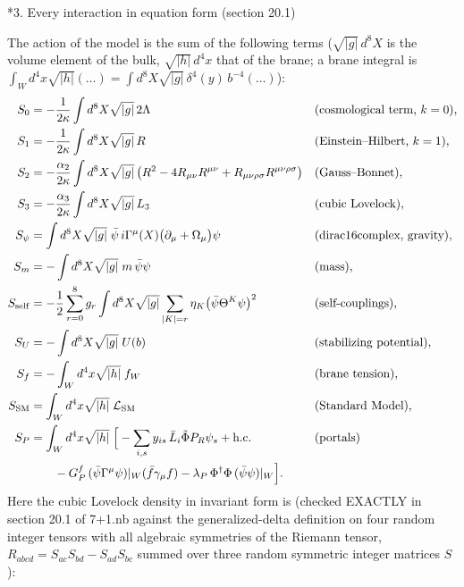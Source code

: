 \documentclass[10pt,a4paper]{article}
\makeatletter
\renewcommand\section{\@startsection{section}{1}{\z@}{-3.5ex \@plus -1ex \@minus -.2ex}{2.3ex \@plus.2ex}{\normalfont\Large\bfseries\raggedright}}
\makeatother
\begin{document}
\section*{3. Every interaction in equation form (section 20.1)}
The action of the model is the sum of the following terms ($\sqrt{|g|}\,d^8X$ is the volume element of the bulk, $\sqrt{|h|}\,d^4x$ that of the brane; a brane integral is $\int_Wd^4x\sqrt{|h|}(\dots)=\int d^8X\sqrt{|g|}\,\delta^4(y)\,b^{-4}(\dots)$):
\begin{align*}
S_0&=-\frac1{2\kappa}\int d^8X\sqrt{|g|}\,2\Lambda &&\text{(cosmological term, }k=0), \\
S_1&=-\frac1{2\kappa}\int d^8X\sqrt{|g|}\,R &&\text{(Einstein–Hilbert, }k=1), \\
S_2&=-\frac{\alpha_2}{2\kappa}\int d^8X\sqrt{|g|}\,\big(R^2-4R_{\mu\nu}R^{\mu\nu}+R_{\mu\nu\rho\sigma}R^{\mu\nu\rho\sigma}\big) &&\text{(Gauss–Bonnet)}, \\
S_3&=-\frac{\alpha_3}{2\kappa}\int d^8X\sqrt{|g|}\,L_3 &&\text{(cubic Lovelock)}, \\
S_\psi&=\int d^8X\sqrt{|g|}\;\bar\psi\,i\Gamma^\mu(X)\big(\partial_\mu+\Omega_\mu\big)\psi &&\text{(dirac16complex, gravity)}, \\
S_m&=-\int d^8X\sqrt{|g|}\;m\,\bar\psi\psi &&\text{(mass)}, \\
S_{\rm self}&=-\frac12\sum_{r=0}^{8}g_r\int d^8X\sqrt{|g|}\sum_{|K|=r}\eta_K\big(\bar\psi\Theta^K\psi\big)^2 &&\text{(self-couplings)}, \\
S_U&=-\int d^8X\sqrt{|g|}\;U(b) &&\text{(stabilizing potential)}, \\
S_f&=-\int_Wd^4x\sqrt{|h|}\;f_W &&\text{(brane tension)}, \\
S_{\rm SM}&=\int_Wd^4x\sqrt{|h|}\;\mathcal L_{\rm SM} &&\text{(Standard Model)}, \\
S_P&=\int_Wd^4x\sqrt{|h|}\;\Big[-\sum_{i,s}y_{is}\,\bar L_i\tilde\Phi P_R\psi_s+\text{h.c.} &&\text{(portals)} \\
&\qquad-G_P^f\,(\bar\psi\Gamma^\mu\psi)|_W(\bar f\gamma_\mu f)-\lambda_P\,\Phi^\dagger\Phi\,(\bar\psi\psi)|_W\Big].
\end{align*}
Here the cubic Lovelock density in invariant form is (checked EXACTLY in section 20.1 of 7+1.nb against the generalized-delta definition on four random integer tensors with all algebraic symmetries of the Riemann tensor, $R_{abcd}=S_{ac}S_{bd}-S_{ad}S_{bc}$ summed over three random symmetric integer matrices $S$):
\end{document}
